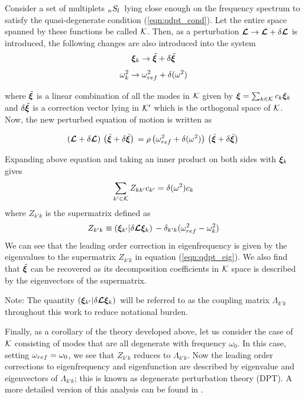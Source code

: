 Consider a set of multiplets $_{n}S_{l}\,$ lying close enough on the frequency spectrum to satisfy the quasi-degenerate condition (\ref{eqn:qdpt_cond}). Let the entire space spanned by these functions be called $\mathcal{K}$. Then, as a perturbation $\bm{\mathcal{L}} \rightarrow \bm{\mathcal{L}} + \delta\bm{\mathcal{L}}$ is introduced, the following changes are also introduced into the system
\begin{equation}
\bm{\xi}_k \rightarrow \tilde{\bm{\xi}} + \delta\tilde{\bm{\xi}}
\end{equation}
\begin{equation}
\omega_{k}^2 \rightarrow \omega_{ref}^2 + \delta(\omega^{2})
\end{equation}

where $\tilde{\bm{\xi}}$ is a linear combination of all the modes in $\mathcal{K}$ given by $\bm{\xi} = \sum_{k \in \mathcal{K}} c_k \bm{\xi}_{k}$ and $\delta \tilde{\bm{\xi}}$ is a correction vector lying in $\mathcal{K}'$ which is the orthogonal space of $\mathcal{K}$. Now, the new perturbed equation of motion is written as

\begin{equation}
\left( \bm{\mathcal{L}} + \delta \bm{\mathcal{L}} \right)\, \left( \tilde{\bm{\xi}} + \delta\tilde{\bm{\xi}} \right)\, = \rho \left( \omega_{ref}^2 + \delta(\omega^{2}) \right)\, \left( \tilde{\bm{\xi}} + \delta\tilde{\bm{\xi}} \right)\,
\end{equation}

Expanding above equation and taking an inner product on both sides with $\bm{\xi}_k$ gives
\begin{equation}\label{eqn:qdpt_eig}
\sum_{k'\in \mathcal{K}} Z_{kk'} c_{k'} = \delta(\omega^{2}) c_{k}
\end{equation}
where $Z_{k'k}$ is the supermatrix defined as 
\begin{equation}
Z_{k'k} \equiv (\bm{\xi}_{k'}|\delta \bm{\mathcal{L}}\bm{\xi}_{k})\, - \delta_{k'k} (\omega_{ref}^2 - \omega_{k}^2)
\end{equation}
We can see that the leading order correction in eigenfrequency is given by the eigenvalues to the supermatrix $Z_{k'k}$ in equation (\ref{eqn:qdpt_eig}). We also find that $\tilde{\bm{\xi}}$ can be recovered as its decomposition coefficients in $\mathcal{K}$ space is described by the eigenvectors of the supermatrix.

Note: The quantity $(\bm{\xi}_{k'}|\delta \bm{\mathcal{L}}\bm{\xi}_{k})\,$ will be referred to as the coupling matrix $\Lambda_{k'k}$ throughout this work to reduce notational burden.

Finally, as a corollary of the theory developed above, let us consider the case of $\mathcal{K}$ consisting of modes that are all degenerate with frequency $\omega_0$. In this case, setting $\omega_{ref} = \omega_0$, we see that $Z_{k'k}$ reduces to $\Lambda_{k'k}$. Now the leading order corrections to eigenfrequency and eigenfunction are described by eigenvalue and eigenvectors of $\Lambda_{k'k}$; this is known as degenerate perturbation theory (DPT). A more detailed version of this analysis can be found in \cite{lavely92}.


